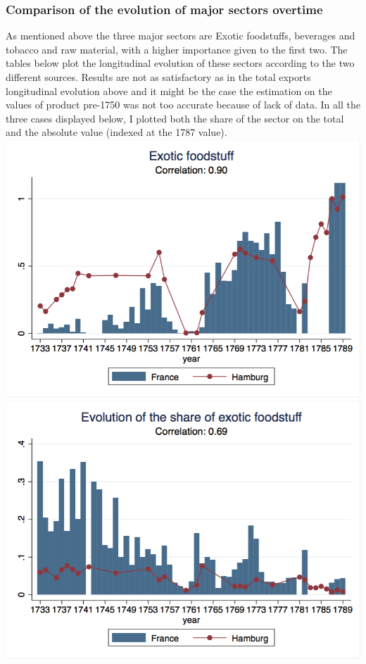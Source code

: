 \documentclass[12pt,a4paper,titlepage,english]{article}
\begin{document}
\subsubsection{Comparison of the evolution of major sectors overtime}
As mentioned above the three major sectors are Exotic foodstuffs, beverages and tobacco and raw material, with a higher importance given to the first two. The tables below plot the longitudinal evolution of these sectors according to the two different sources. Results are not as satisfactory as in the total exports longitudinal evolution above and it might be the case the estimation on the values of product pre-1750 was not too accurate because of lack of data. In all the three cases displayed below, I plotted both the share of the sector on the total and the absolute value (indexed at the 1787 value). 
\includegraphics[scale=.28]{exotic_food_long.png}
\includegraphics[scale=.28]{exotic_food_share.png}\\
\end{document}
